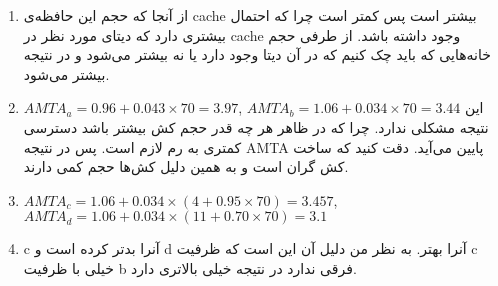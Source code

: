 
\begin{enumerate}[leftmargin=0cm,itemindent=.5cm,label=\alph*.]
    \item از آنجا که حجم این حافظه‌ی
    cache
    بیشتر است پس
    کمتر است چرا که احتمال بیشتری دارد که دیتای مورد نظر در
    cache
    وجود داشته باشد.
    از طرفی حجم خانه‌هایی که باید چک کنیم که در آن دیتا وجود دارد یا نه بیشتر می‌شود و در نتیجه
    بیشتر می‌شود.
    \item $AMTA_a = 0.96 + 0.043 \times 70 = 3.97$, $AMTA_b = 1.06 + 0.034 \times 70 = 3.44$
    این نتیجه مشکلی ندارد. چرا که در ظاهر هر چه قدر حجم کش بیشتر باشد دسترسی کمتری به رم لازم است.
    پس در نتیجه
    AMTA
    پایین می‌آید.
    دقت کنید که ساخت کش گران است و به همین دلیل کش‌ها حجم کمی دارند.
    \item $AMTA_c = 1.06 + 0.034 \times (4 + 0.95 \times 70) = 3.457$, $AMTA_d = 1.06 + 0.034 \times (11 + 0.70 \times 70) = 3.1$
    \item c
    آنرا بدتر کرده است و
    d
    آنرا بهتر. به نظر من دلیل آن این است که ظرفیت
    c
    خیلی با ظرفیت
    b
    فرقی ندارد در نتیجه
    خیلی بالاتری دارد.
\end{enumerate}